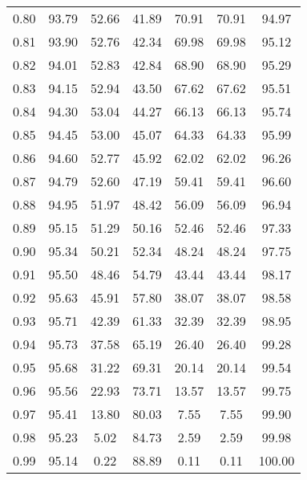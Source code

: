 \begin{tabular}{|c|c|c|c|c|c|c|}
      0.80 &     93.79 &     52.66 &      41.89 &   70.91 &      70.91 &         94.97 \\
      0.81 &     93.90 &     52.76 &      42.34 &   69.98 &      69.98 &         95.12 \\
      0.82 &     94.01 &     52.83 &      42.84 &   68.90 &      68.90 &         95.29 \\
      0.83 &     94.15 &     52.94 &      43.50 &   67.62 &      67.62 &         95.51 \\
      0.84 &     94.30 &     53.04 &      44.27 &   66.13 &      66.13 &         95.74 \\
      0.85 &     94.45 &     53.00 &      45.07 &   64.33 &      64.33 &         95.99 \\
      0.86 &     94.60 &     52.77 &      45.92 &   62.02 &      62.02 &         96.26 \\
      0.87 &     94.79 &     52.60 &      47.19 &   59.41 &      59.41 &         96.60 \\
      0.88 &     94.95 &     51.97 &      48.42 &   56.09 &      56.09 &         96.94 \\
      0.89 &     95.15 &     51.29 &      50.16 &   52.46 &      52.46 &         97.33 \\
      0.90 &     95.34 &     50.21 &      52.34 &   48.24 &      48.24 &         97.75 \\
      0.91 &     95.50 &     48.46 &      54.79 &   43.44 &      43.44 &         98.17 \\
      0.92 &     95.63 &     45.91 &      57.80 &   38.07 &      38.07 &         98.58 \\
      0.93 &     95.71 &     42.39 &      61.33 &   32.39 &      32.39 &         98.95 \\
      0.94 &     95.73 &     37.58 &      65.19 &   26.40 &      26.40 &         99.28 \\
      0.95 &     95.68 &     31.22 &      69.31 &   20.14 &      20.14 &         99.54 \\
      0.96 &     95.56 &     22.93 &      73.71 &   13.57 &      13.57 &         99.75 \\
      0.97 &     95.41 &     13.80 &      80.03 &    7.55 &       7.55 &         99.90 \\
      0.98 &     95.23 &      5.02 &      84.73 &    2.59 &       2.59 &         99.98 \\
      0.99 &     95.14 &      0.22 &      88.89 &    0.11 &       0.11 &        100.00 \\
\bottomrule
\end{tabular}
